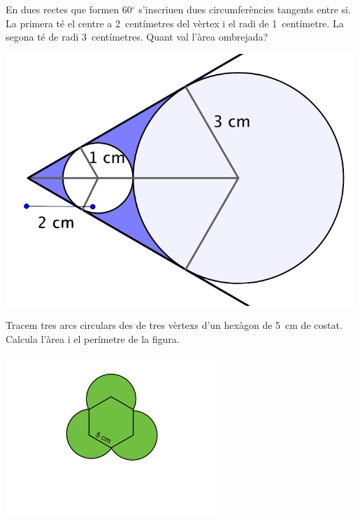 \begin{mylist}
 
\vspace{-1.5cm}
\exer \begin{minipage}[t]{0.62\textwidth}
	En dues rectes que formen 60${}^\circ$  s'inscriuen dues circumferències tangents entre si.  La primera té el centre a 2~centímetres del vèrtex i el radi de 1~centímetre. La segona  té de radi 3~centímetres. Quant val l'àrea ombrejada? 
	
\end{minipage}
\begin{minipage}{0.3\textwidth}
	\centering
	\vspace{1.5cm}
	\includegraphics[width=0.99\textwidth]{img-09/fig16}
\end{minipage}
 
 
 \vspace{-1.5cm}
 \exer[1] \begin{minipage}[t]{0.62\textwidth}
 	 Tracem tres arcs circulars des de tres vèrtexs d'un hexàgon de 5~cm de costat. Calcula l'àrea i el perímetre de la figura.
 \end{minipage}
 \begin{minipage}{0.3\textwidth}
 	\centering
 	\vspace{1.5cm}
 	\includegraphics[width=0.6\textwidth]{img-09/fig15}
 \end{minipage}
  
 
\end{mylist}
 

